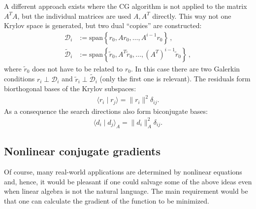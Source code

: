     A different approach exists where the CG algorithm is not applied to the matrix $A^T\!A$, but the individual matrices are used $A,A^T$ directly. This way not one Krylov space is generated, but two dual ``copies'' are constructed:
    \begin{align*}
        \mathcal{D}_i &:= \mathrm{span}\left\{r_0,Ar_0,\ldots,A^{i-1}r_0\right\}\,,\\
        \widetilde{\mathcal{D}}_i &:= \mathrm{span}\left\{\widetilde{r}_0,A^T\widetilde{r}_0,\ldots,(A^T)^{i-1}\widetilde{r}_0\right\}\,,
    \end{align*}
    where $\widetilde{r}_0$ does not have to be related to $r_0$. In this case there are two Galerkin conditions $r_i\perp\mathcal{D}_i$ and $\widetilde{r}_i\perp\widetilde{\mathcal{D}}_i$ (only the first one is relevant). The residuals form biorthogonal bases of the Krylov subspaces:
    \begin{gather}
        \langle r_i\mid r_j \rangle = \|r_i\|^2\delta_{ij}.
    \end{gather}
    As a consequence the search directions also form biconjugate bases:
    \begin{gather}
        \langle d_i\mid d_j \rangle_A = \|d_i\|_A^2\delta_{ij}.
    \end{gather}

\subsection{Nonlinear conjugate gradients}

    Of course, many real-world applications are determined by nonlinear equations and, hence, it would be pleasant if one could salvage some of the above ideas even when linear algebra is not the natural language. The main requirement would be that one can calculate the gradient of the function to be minimized.

